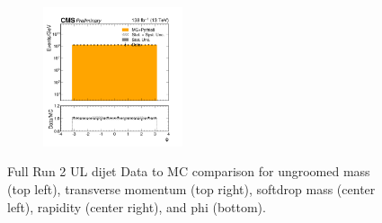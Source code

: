 \begin{figure}[h!]
\begin{subfigure}
  \end{subfigure}
  \begin{subfigure}
    \centering
    \includegraphics[width=0.45\textwidth]{figures/multijet/dijet/phi_allyears_coarsebin.png}
  \end{subfigure}
  \caption{Full Run 2 UL dijet Data to MC comparison for ungroomed mass (top left), transverse momentum (top right), softdrop mass (center left), rapidity (center right), and phi (bottom).}
	\label{fig:15}
\end{figure}
